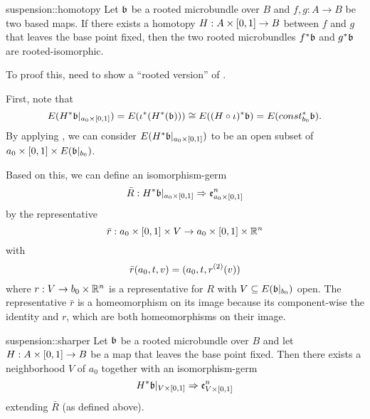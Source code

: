 \begin{mytheorem}{suspension::homotopy}
    Let $\mathfrak{b}$ be a rooted microbundle over $B$ and $f, g: A \to B$ be two based maps.
    If there exists a homotopy $H: A \times{} [0, 1] \to B$ between $f$ and $g$ that leaves the base point fixed,
    then the two rooted microbundles $f^*\mathfrak{b}$ and $g^*\mathfrak{b}$ are rooted-isomorphic.
\end{mytheorem}

\begin{myparagraph}
    To proof this, need to show a ``rooted version'' of .
    
    First, note that 
    \[
        E(H^*\mathfrak{b}\vert_{a_0 \times{} [0, 1]}) = E(\iota^*(H^*(\mathfrak{b})))
        \cong E((H \circ \iota)^*\mathfrak{b}) = E(const_{b_0}^*\mathfrak{b}).
    \]
    By applying , we can consider $E(H^*\mathfrak{b}\vert_{a_0 \times{} [0, 1]})$
    to be an open subset of $a_0 \times [0, 1] \times E(\mathfrak{b}\vert_{b_0})$.

    Based on this, we can define an isomorphism-germ
    \[ \bar{R}: H^*\mathfrak{b}\vert_{a_0 \times{} [0, 1]} \Rightarrow{} \mathfrak{e}^{n}_{a_0 \times{} [0, 1]} \]
    by the representative
    \[ \bar{r}: a_0 \times{} [0, 1] \times V \to a_0 \times{} [0, 1] \times \mathbb{R}^n \]
    with
    \[ \bar{r}(a_0, t, v) = (a_0, t, r^{(2)}(v) )\]
    where $r: V \to b_0 \times \mathbb{R}^n$ is a representative for $R$ with $V \subseteq{} E(\mathfrak{b}\vert_{b_0})$ open.
    The representative $\bar{r}$ is a homeomorphism on its image
    because its component-wise the identity and $r$, which are both homeomorphisms on their image. 
\end{myparagraph}

\begin{mylemma}{suspension::sharper}
    Let $\mathfrak{b}$ be a rooted microbundle over $B$ and
    let $H: A \times{} [0, 1] \to B$ be a map that leaves the base point fixed.
    Then there exists a neighborhood $V$ of $a_0$ together with an isomorphism-germ
    \[ H^*\mathfrak{b}\vert_{V \times{} [0, 1]} \Rightarrow{} \mathfrak{e}^{n}_{V \times{} [0, 1]} \]
    extending $\bar{R}$ (as defined above).
\end{mylemma}

